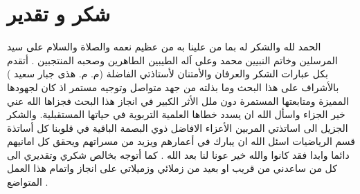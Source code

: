 \chapter*{شكر و تقدير}
\begin{center}
	الحمد لله والشكر له بما من علينا به من عظيم نعمه والصلاة والسلام على سيد المرسلين وخاتم النبيين محمد وعلى اَله الطيبين الطاهرين وصحبه المنتجبين . 
أتقدم بكل عبارات الشكر والعرفان والأمتنان لأستاذتي الفاضلة (م. م. هذى جبار سعيد )
بالأشراف على هذا البحث وما بذلته من جهد متواصل وتوجيه مستمر اذ كان لجهودها المميزة ومتابعتها المستمرة دون ملل الأثر الكبير في انجاز هذا البحث فجزاها الله عني خير الجزاء واسأل الله ان يسدد خطاها العلمية التربوية في حياتها المستقبلية. 
والشكر الجزيل الى اساتذتي المربين الأعزاء الافاضل ذوي البصمة الباقية في قلوبنا كل أساتذة قسم الرياضيات اسئل الله ان يبارك في أعمارهم ويزيد من مسراتهم ويحقق كل امانيهم دائما وابدا فقد كانوا والله خير عونا لنا  بعد الله . 
كما أتوجه بخالص شكري وتقديري الى كل من ساعدني من قريب او بعيد من زملائي وزميلاتي على انجاز واتمام هذا العمل المتواضع .
\end{center}

